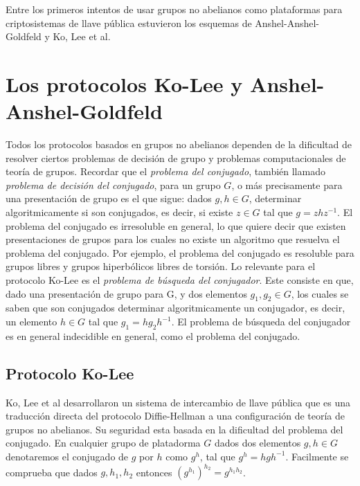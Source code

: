 \documentclass[12pt]{article}
\theoremstyle{definition}
\begin{document}
Entre los primeros intentos de usar grupos no abelianos como plataformas para criptosistemas de llave pública estuvieron los esquemas de Anshel-Anshel-Goldfeld y Ko, Lee et al. 

\section{Los protocolos Ko-Lee y Anshel-Anshel-Goldfeld}

Todos los protocolos basados en grupos no abelianos dependen de la dificultad de resolver ciertos problemas de decisión de grupo y problemas computacionales de teoría de grupos. Recordar que el \textit{problema del conjugado}, también llamado \textit{problema de decisión del conjugado}, para un grupo $G$, o más precisamente para una presentación de grupo es el que sigue: dados $g,h\in G$, determinar algoritmicamente si son conjugados, es decir, si existe $z\in G$ tal que $g = zhz^{-1}$. El problema del conjugado es irresoluble en general, lo que quiere decir que existen presentaciones de grupos para los cuales no existe un algoritmo que resuelva el problema del conjugado. Por ejemplo, el problema del conjugado es resoluble para grupos libres y grupos hiperbólicos libres de torsión.
\newline
\newline
Lo relevante para el protocolo Ko-Lee es el \textit{problema de búsqueda del conjugador}. Este consiste en que, dado una presentación de grupo para G, y dos elementos $g_1,g_2\in G$, los cuales se saben que son conjugados determinar algoritmicamente un conjugador, es decir, un elemento $h\in G$ tal que $g_1 = hg_2h^{-1}$. El problema de búsqueda del conjugador es en general indecidible en general, como el problema del conjugado.

\subsection{Protocolo Ko-Lee}
Ko, Lee et al desarrollaron un sistema de intercambio de llave pública que es una traducción  directa del protocolo Diffie-Hellman a una configuración de teoría de grupos no abelianos. Su seguridad esta basada en la dificultad del problema del conjugado. 
\newline
\newline
En cualquier grupo de platadorma $G$ dados dos elementos $g,h\in G$ denotaremos el conjugado de $g$ por $h$ como $g^h$, tal que $g^h = hgh^{-1}$. Facilmente se comprueba que dados $g,h_1,h_2$ entonces $(g^{h_1})^{h_2}=g^{h_1h_2}$.
\end{document}
